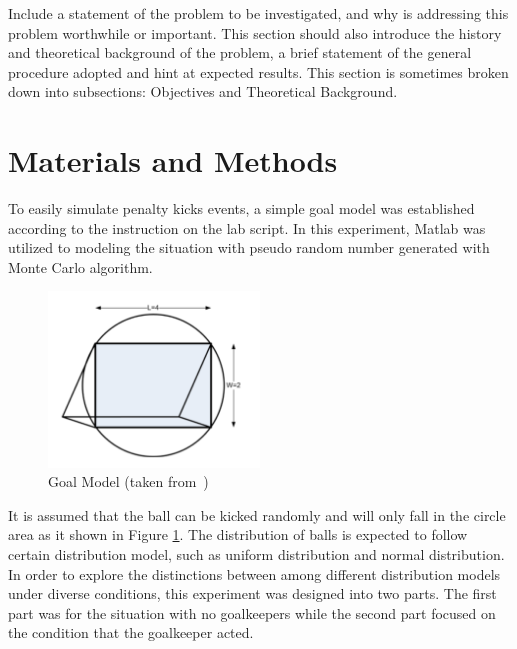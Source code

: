 \documentclass[11pt, a4paper]{article}
\begin{document}
Include a statement of the problem to be investigated, and why is addressing this problem worthwhile or important. This section should also introduce the history and theoretical background of the problem, a brief statement of the general procedure adopted and hint at expected results. This section is sometimes broken down into subsections: Objectives and Theoretical Background.

\section{Materials and Methods}



To easily simulate penalty kicks events, a simple goal model was established according to the instruction on the lab script\cite{ref:lab}. In this experiment, Matlab was utilized to modeling the situation with pseudo random number generated with Monte Carlo algorithm.


\begin{figure}[htbp]     \begin{centering}
    \includegraphics[width=0.5\textwidth]{goal.png}
    \caption{Goal Model (taken from~\cite{ref:lab})}
    \label{Fig:goal}
    \end{centering}
\end{figure}


It is assumed that the ball can be kicked randomly and will only fall in the circle area as it shown in Figure \ref{Fig:goal}. The distribution of balls is expected to follow certain distribution model, such as uniform distribution and normal distribution. In order to explore the distinctions between among different distribution models under diverse conditions, this experiment was designed into two parts. The first part was for the situation with no goalkeepers while the second part focused on the condition that the goalkeeper acted.
\end{document}
